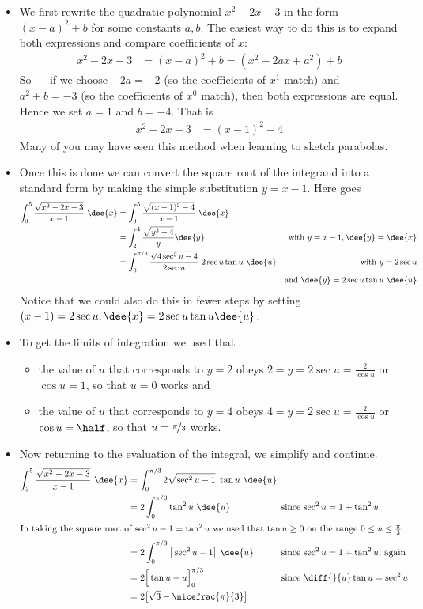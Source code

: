\begin{eg}
\soln
\begin{itemize}
 \item  We first rewrite the quadratic polynomial $x^2-2x-3$ in the form $(x-a)^2+b$ for
some constants $a,b$. The easiest way to do this is to expand both expressions and
compare coefficients of $x$:
\begin{align*}
  x^2-2x-3 &= (x-a)^2+b = (x^2-2ax+a^2)+b
\end{align*}
So --- if we choose $-2a=-2$ (so the coefficients of $x^1$ match) and $a^2+b=-3$ (so the
coefficients of $x^0$ match), then both expressions are equal. Hence we set $a=1$ and
$b=-4$. That is
\begin{align*}
x^2-2x-3 &= (x-1)^2-4
\end{align*}
Many of you may have seen this method when learning to sketch parabolas.
\item Once this is done we can convert the square root of the integrand into a standard
form by making the simple substitution $y=x-1$. Here goes
\begin{align*}
\int_3^5\frac{\sqrt{x^2-2x-3}}{x-1}\ \dee{x}
&=\int_3^5\frac{\sqrt{(x-1)^2-4}}{x-1}\ \dee{x} \\
&=\int_2^4\frac{\sqrt{y^2-4}}{y}\dee{y}
&\text{with $y=x-1, \dee{y} = \dee{x}$}\\
&=\int_0^{\pi/3}\frac{\sqrt{4\sec^2u-4}}{2\sec u}\ 2\sec u\tan u\ \dee{u}
&\text{with $y=2\sec u$}\\
&& \text{and $\dee{y} = 2\sec u\tan u\ \dee{u}$}
\end{align*}
Notice that we could also do this in fewer steps by setting $(x-1)=2\sec u,
\dee{x}=2\sec u\tan u\dee{u}$.
\item
To get the limits of integration we used that
\begin{itemize}
\item the value of $u$ that corresponds to $y=2$ obeys
  $2=y=2\sec u=\frac{2}{\cos u}$ or $\cos u=1$, so that $u=0$ works and
\item the value of $u$ that corresponds to $y=4$ obeys
  $4=y=2\sec u=\frac{2}{\cos u}$ or $\cos u=\half$, so that
  $u=\nicefrac{\pi}{3}$ works.
\end{itemize}
\item Now returning to the evaluation of the integral, we simplify and
continue.
\begin{align*}
\int_3^5\frac{\sqrt{x^2-2x-3}}{x-1}\ \dee{x}
&=\int_0^{\pi/3} 2\sqrt{\sec^2 u -1}\ \tan u\ \dee{u} \hidewidth\\
&=2\int_0^{\pi/3} \tan^2 u\ \dee{u}
&&\qquad\text{since $\sec^2u=1+\tan^2u$}\\
\intertext{In taking the square root of $\sec^2u-1=\tan^2u$ we used that $\tan u\ge 0$ on
the range $0\le u\le \frac{\pi}{3}$.}
&=2\int_0^{\pi/3}\big[ \sec^2 u-1\big]\ \dee{u}
&&\qquad\text{since $\sec^2u=1+\tan^2u$, again}\\
&=2\Big[\tan u - u\Big]_0^{\pi/3} 
&&\qquad\text{since $\diff{}{u}\tan u=\sec^2u$}\\
&=2\big[\sqrt{3}-\nicefrac{\pi}{3}\big]
\end{align*}
\end{itemize}


\end{eg}
